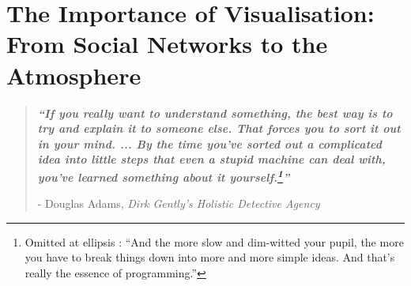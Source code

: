 \documentclass[twoside,openleft,reqno,a4paper,final]{book}
\author{Dan Ellis }
\date{March 2019}
\def\blankpage{%
      \clearpage%
      \thispagestyle{empty}%
      \addtocounter{page}{-2}%
      \null%
      \clearpage}
\begin{document}


\titleformat{\paragraph}[hang]{\normalfont\normalsize\bfseries}{\theparagraph}{1em}{}

\setcounter{secnumdepth}{5}
\setcounter{tocdepth}{4}
\setcounter{page}{200}
\setcounter{chapter}{1}

\cleardoublepage{}
\chapter{ The Importance of Visualisation:  From Social Networks to the Atmosphere }
\cleardoublepage{}
\restoregeometry
\vspace*{0.15\paperheight} 



\begin{center}
\begin{quotation}
  \large{\emph{\textbf{``If you really want to understand something, the best way is to try and explain it to someone else. That forces you to sort it out in your mind. ... By the time you’ve sorted out a complicated idea into little steps that even a stupid machine can deal with, you’ve learned something about it yourself.\footnote{ Omitted at ellipsis : ``And the more slow and dim-witted your pupil, the more you have to break things down into more and more simple ideas. And that’s really the essence of programming.''}''} }  }  \\
  \begin{flushright}
  - Douglas Adams, \textit{Dirk Gently's Holistic Detective Agency} 

  \end{flushright}
 \end{quotation}
\end{center}


\doublespacing

\newpage
\setlength{\footnotesep}{0.5cm}
\raggedbottom %




  
 
% 
% 

% 


 

% 
\end{document}

